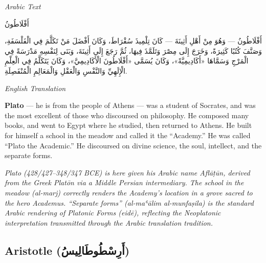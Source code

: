 \documentclass[11pt,a4paper]{article}
\def\RL#1{\beginR#1\endR}
\newcommand{\cnote}[1]{\textcolor{notecolor}{\textit{#1}}}
\newcommand{\textarabic}[1]{{\arabicfont\RL{#1}}}
\newenvironment{arabiccol}{%
  \begin{minipage}[t]{0.48\textwidth}%
  \begin{tcolorbox}[colback=leftbg,colframe=rulecolor,boxrule=0.4pt,arc=2pt,left=5pt,right=5pt,top=5pt,bottom=5pt]%
  \centering\textit{\footnotesize Arabic Text}\\[0.4em]%
  \raggedright\arabicfont\small%
}{%
  \end{tcolorbox}%
  \end{minipage}%
}
\newenvironment{englishcol}{%
  \begin{minipage}[t]{0.48\textwidth}%
  \begin{tcolorbox}[colback=rightbg,colframe=rulecolor,boxrule=0.4pt,arc=2pt,left=5pt,right=5pt,top=5pt,bottom=5pt]%
  \centering\textit{\footnotesize English Translation}\\[0.4em]%
  \raggedright\small%
}{%
  \end{tcolorbox}%
  \end{minipage}%
}
\begin{document}
\noindent
\begin{arabiccol}
\beginR
أَفْلَاطُونُ

أَفْلَاطُونُ — وَهُوَ مِنْ أَهْلِ أَثِينَةَ — كَانَ تِلْمِيذَ سُقْرَاطَ، وَكَانَ أَفْضَلَ مَنْ تَكَلَّمَ فِي الْفَلْسَفَةِ، وَصَنَّفَ كُتُبًا كَثِيرَةً، وَخَرَجَ إِلَى مِصْرَ وَتَلَمَّذَ فِيهَا، ثُمَّ رَجَعَ إِلَى أَثِينَةَ، وَبَنَى لِنَفْسِهِ مَدْرَسَةً فِي الْمَرْجِ وَسَمَّاهَا «أَكَادِيمِيَّةً»، وَكَانَ يُسَمَّى «أَفْلَاطُونَ الْأَكَادِيمِيَّ»، وَكَانَ يَتَكَلَّمُ فِي الْعِلْمِ الْإِلَهِيِّ وَالنَّفْسِ وَالْعَقْلِ وَالْمَعَالِمِ الْمُنْفَصِلَةِ.
\endR
\end{arabiccol}
\hfill
\begin{englishcol}
\textbf{Plato} --- he is from the people of Athens --- was a student of Socrates, and was the most excellent of those who discoursed on philosophy. He composed many books, and went to Egypt where he studied, then returned to Athens. He built for himself a school in the meadow and called it the ``Academy.'' He was called ``Plato the Academic.'' He discoursed on divine science, the soul, intellect, and the separate forms.

\cnote{Plato (428/427--348/347 BCE) is here given his Arabic name \textit{Aflāṭūn}, derived from the Greek \textit{Platōn} via a Middle Persian intermediary. The school in the meadow (\textit{al-marj}) correctly renders the Academy's location in a grove sacred to the hero Academus. ``Separate forms'' (\textit{al-maʿālim al-munfaṣila}) is the standard Arabic rendering of Platonic Forms (\textit{eidē}), reflecting the Neoplatonic interpretation transmitted through the Arabic translation tradition.}
\end{englishcol}

\par\vspace{0.5em}

\subsection{Aristotle (\textarabic{أَرِسْطُوطَالِيسُ})}
\end{document}

